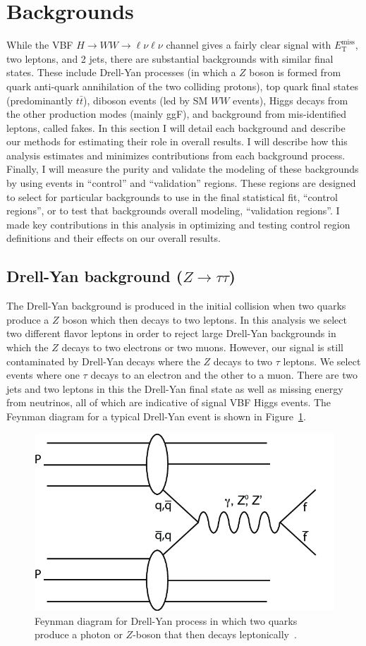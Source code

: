 \section{Backgrounds}
While the VBF $H\rightarrow WW\rightarrow \ell\nu\ell\nu$ channel gives a fairly clear signal with $E_{\text{T}}^{\text{miss}}$, two leptons, and 2 jets, there are substantial backgrounds with similar final states. These include Drell-Yan processes (in which a $Z$ boson is formed from quark anti-quark annihilation of the two colliding protons), top quark final states (predominantly $t\bar{t}$), diboson events (led by SM $WW$ events), Higgs decays from the other production modes (mainly ggF), and background from mis-identified leptons, called fakes. In this section I will detail each background and describe our methods for estimating their role in overall results. I will describe how this analysis estimates and minimizes contributions from each background process. Finally, I will measure the purity and validate the modeling of these backgrounds by using events in ``control'' and ``validation'' regions. These regions are designed to select for particular backgrounds to use in the final statistical fit, ``control regions'', or to test that backgrounds overall modeling, ``validation regions''.  I made key contributions in this analysis in optimizing and testing control region definitions and their effects on our overall results. 

\subsection{Drell-Yan background ($Z\rightarrow \tau\tau$)}
The Drell-Yan background is produced in the initial collision when two quarks produce a $Z$ boson which then decays to two leptons. In this analysis we select two different flavor leptons in order to reject large Drell-Yan backgrounds in which the $Z$ decays to two electrons or two muons. However, our signal is still contaminated by Drell-Yan decays where the $Z$ decays to two $\tau$ leptons. We select events where one $\tau$ decays to an electron and the other to a muon. There are two jets and two leptons in this the Drell-Yan final state as well as missing energy from neutrinos, all of which are indicative of signal VBF Higgs events. The Feynman diagram for a typical Drell-Yan event is shown in Figure~\ref{fig:DrellYan}. 

\begin{figure}
\centering
\includegraphics[width=.35\linewidth]{Pictures/FeynmanDrellYan.png}
\caption{Feynman diagram for Drell-Yan process in which two quarks produce a photon or $Z$-boson that then decays leptonically~\cite{DrellYan}.}
\label{fig:DrellYan}
\end{figure}

